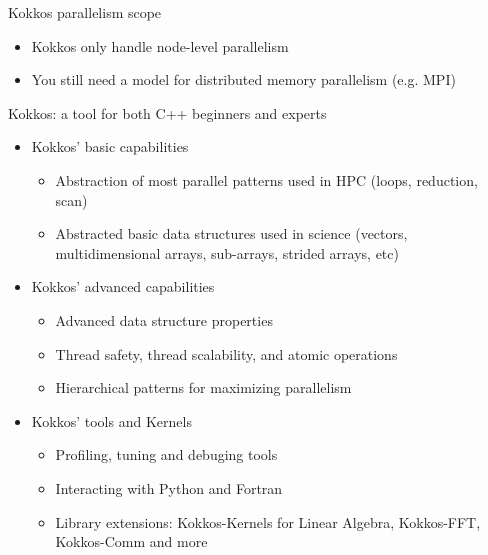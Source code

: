 \documentclass[aspectratio=169]{beamer}
\begin{document}

\begin{frame}{Kokkos parallelism scope}
    \begin{itemize}
        \item Kokkos only handle node-level parallelism
        \item You still need a model for distributed memory parallelism (e.g. MPI)
    \end{itemize}
\end{frame}


\begin{frame}{Kokkos: a tool for both C++ beginners and experts}
    \begin{itemize}
        \item Kokkos' basic capabilities
        \begin{itemize}
            \item Abstraction of most parallel patterns used in HPC (loops, reduction, scan)
            \item Abstracted basic data structures used in science (vectors, multidimensional arrays, sub-arrays, strided arrays, etc)
        \end{itemize}
        \item Kokkos' advanced capabilities
        \begin{itemize}
            \item Advanced data structure properties
            \item Thread safety, thread scalability, and atomic operations
            \item Hierarchical patterns for maximizing parallelism
        \end{itemize}
        \item Kokkos' tools and Kernels
        \begin{itemize}
            \item Profiling, tuning and debuging tools
            \item Interacting with Python and Fortran
            \item Library extensions: Kokkos-Kernels for Linear Algebra, Kokkos-FFT, Kokkos-Comm and more
        \end{itemize}
    \end{itemize}
\end{frame}
\end{document}
